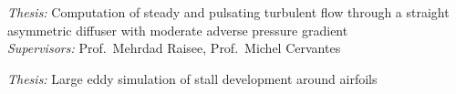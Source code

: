 \begin{cvbody}
\textit{Thesis:} Computation of steady and pulsating turbulent flow through a straight asymmetric diffuser with moderate adverse pressure gradient\\
\textit{Supervisors:} Prof.\ Mehrdad Raisee, Prof.\ Michel Cervantes
\end{cvbody}

\begin{cvbody}
\textit{Thesis:} Large eddy simulation of stall development around airfoils
\end{cvbody}
\renewcommand{\cventrysep}{0.95em}
